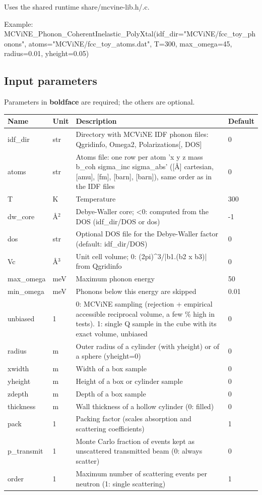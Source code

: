 Uses the shared runtime share/mcvine-lib.h/.c.

Example: MCViNE\_Phonon\_CoherentInelastic\_PolyXtal(idf\_dir="MCViNE/fcc\_toy\_phonons", atoms="MCViNE/fcc\_toy\_atoms.dat", T=300, max\_omega=45, radius=0.01, yheight=0.05)

\subsection*{Input parameters}
Parameters in \textbf{boldface} are required; the others are optional.

\begin{longtable}{p{}p{}p{}p{}}
\toprule
\textbf{Name} & \textbf{Unit} & \textbf{Description} & \textbf{Default} \\
\midrule
\endhead
idf\_dir & str & Directory with MCViNE IDF phonon files: Qgridinfo, Omega2, Polarizations[, DOS] & 0 \\
atoms & str & Atoms file: one row per atom 'x y z mass b\_coh sigma\_inc sigma\_abs' ([\AA{}] cartesian, [amu], [fm], [barn], [barn]), same order as in the IDF files & 0 \\
T & K & Temperature & 300 \\
dw\_core & \AA{}$^{2}$ & Debye-Waller core; \textless{}0: computed from the DOS (idf\_dir/DOS or dos) & -1 \\
dos & str & Optional DOS file for the Debye-Waller factor (default: idf\_dir/DOS) & 0 \\
Vc & \AA{}$^{3}$ & Unit cell volume; 0: (2pi)\textasciicircum{}3/|b1.(b2 x b3)| from Qgridinfo & 0 \\
max\_omega & meV & Maximum phonon energy & 50 \\
min\_omega & meV & Phonons below this energy are skipped & 0.01 \\
unbiased & 1 & 0: MCViNE sampling (rejection + empirical accessible reciprocal volume, a few \% high in tests). 1: single Q sample in the cube with its exact volume, unbiased & 0 \\
radius & m & Outer radius of a cylinder (with yheight) or of a sphere (yheight=0) & 0 \\
xwidth & m & Width of a box sample & 0 \\
yheight & m & Height of a box or cylinder sample & 0 \\
zdepth & m & Depth of a box sample & 0 \\
thickness & m & Wall thickness of a hollow cylinder (0: filled) & 0 \\
pack & 1 & Packing factor (scales absorption and scattering coefficients) & 1 \\
p\_transmit & 1 & Monte Carlo fraction of events kept as unscattered transmitted beam (0: always scatter) & 0 \\
order & 1 & Maximum number of scattering events per neutron (1: single scattering) & 1 \\
\bottomrule
\end{longtable}

